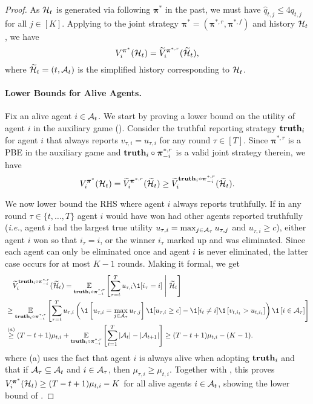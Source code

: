 \begin{proof}
As $\mathcal{H}_t$ is generated via following $\bm \pi^\ast$ in the past, we must have $\hat q_{t,j}\le 4q_{t,j}$ for all $j\in [K]$.
Applying  to the joint strategy $\bm \pi^\ast=({\bm \pi}^{\ast,r},{\bm \pi}^{\ast,f})$ and history $\mathcal{H}_t$, we have
\begin{equation*}
V_i^{\bm\pi^\ast}(\mathcal{H}_t) = \widetilde V_i^{{\bm \pi}^{\ast,r}}(\widetilde {\mathcal{H}}_t),
\end{equation*}
where $\widetilde {\mathcal{H}}_t=(t,\mathcal{A}_t)$ is the simplified history corresponding to $\mathcal{H}_t$.

\paragraph{Lower Bounds for Alive Agents.} Fix an alive agent $i\in\mathcal{A}_t$. We start by proving a lower bound on the utility of agent $i$ in the auxiliary game (). Consider the truthful reporting strategy $\textbf{truth}_i$ for agent $i$ that always reports $v_{\tau,i}=u_{\tau,i}$ for any round $\tau\in[T]$. Since ${\bm \pi}^{\ast,r}$ is a PBE in the auxiliary game and $\textbf{truth}_i\circ {\bm \pi}^{\ast,r}_{-i}$ is a valid joint strategy therein, we have
\begin{equation}\label{eq:pbe_for_lower_bound}
V_i^{\bm\pi^\ast}(\mathcal{H}_t) = \widetilde V_i^{{\bm \pi}^{\ast,r}}(\widetilde {\mathcal{H}}_t)\ge \widetilde V_i^{\textbf{truth}_i\circ {\bm \pi}^{\ast,r}_{-i}}(\widetilde {\mathcal{H}}_{t}).
\end{equation}

We now lower bound the RHS where agent $i$ always reports truthfully. If in any round $\tau\in\{t,\ldots,T\}$ agent $i$ would have won had other agents reported truthfully (\textit{i.e.}, agent $i$ had the largest true utility $u_{\tau,i}=\max_{j\in \mathcal{A}_{\tau}} u_{\tau,j}$ and $u_{\tau,i}\ge c$), either agent $i$ won so that $i_{\tau}=i$, or the winner $i_{\tau}$ marked up and was eliminated. Since each agent can only be eliminated once and agent $i$ is never eliminated, the latter case occurs for at most $K-1$ rounds. Making it formal, we get
\begin{align*}
    &\quad \tilde V_i^{\truth_i\circ {\bm \pi}^{\ast,r}_{-i}}(\tilde \mH_{t}) = \E_{\truth_i\circ {\bm \pi}^{\ast,r}_{-i}}\left [ \sum_{\tau=t}^T u_{\tau,i} \1[i_{\tau}=i] \middle \vert \tilde \mH_t\right ]\\
    &\geq \E_{\truth_i\circ {\bm \pi}^{\ast,r}_{-i}} \sqb{ \sum_{\tau=t}^T u_{\tau,i} \paren{\1\sqb{u_{\tau,i}=\max_{j\in \mA_{\tau}}u_{\tau,j}} \1[u_{\tau,i}\ge c]  - \1[i_t\neq i] \1\sqb{v_{t,i_t}>u_{t,i_t}}} \1\sqb{i\in \mA_{\tau}}}\\
    &\overset{(a)}{\geq} (T-t+1)\mu_{t,i} + \E_{\truth_i\circ {\bm \pi}^{\ast,r}_{-i}} \sqb{ \sum_{t=1}^T |\mA_t|-|\mA_{t+1}|} \geq (T-t+1)\mu_{t,i} - (K-1).
\end{align*}
where (a) uses the fact that agent $i$ is always alive when adopting $\textbf{truth}_i$ and that if $\mathcal{A}_{\tau}\subseteq \mathcal{A}_t$ and $i\in \mathcal{A}_{\tau}$, then $\mu_{\tau,i}\ge \mu_{t,i}$.
Together with , this proves $V_i^{\bm\pi^\ast}(\mathcal{H}_t)\ge (T-t+1)\mu_{t,i}-K$ for all alive agents $i\in\mathcal{A}_t$, showing the lower bound of .


\end{proof}
